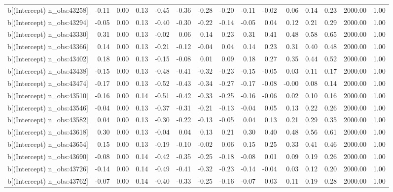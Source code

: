\begin{table}[ht]
\begin{tabular}{rrrrrrrrrrrrrrr}
  b[(Intercept) n\_obs:43258] & -0.11 & 0.00 & 0.13 & -0.45 & -0.36 & -0.28 & -0.20 & -0.11 & -0.02 & 0.06 & 0.14 & 0.23 & 2000.00 & 1.00 \\ 
  b[(Intercept) n\_obs:43294] & -0.05 & 0.00 & 0.13 & -0.40 & -0.30 & -0.22 & -0.14 & -0.05 & 0.04 & 0.12 & 0.21 & 0.29 & 2000.00 & 1.00 \\ 
  b[(Intercept) n\_obs:43330] & 0.31 & 0.00 & 0.13 & -0.02 & 0.06 & 0.14 & 0.23 & 0.31 & 0.41 & 0.48 & 0.58 & 0.65 & 2000.00 & 1.00 \\ 
  b[(Intercept) n\_obs:43366] & 0.14 & 0.00 & 0.13 & -0.21 & -0.12 & -0.04 & 0.04 & 0.14 & 0.23 & 0.31 & 0.40 & 0.48 & 2000.00 & 1.00 \\ 
  b[(Intercept) n\_obs:43402] & 0.18 & 0.00 & 0.13 & -0.15 & -0.08 & 0.01 & 0.09 & 0.18 & 0.27 & 0.35 & 0.44 & 0.52 & 2000.00 & 1.00 \\ 
  b[(Intercept) n\_obs:43438] & -0.15 & 0.00 & 0.13 & -0.48 & -0.41 & -0.32 & -0.23 & -0.15 & -0.05 & 0.03 & 0.11 & 0.17 & 2000.00 & 1.00 \\ 
  b[(Intercept) n\_obs:43474] & -0.17 & 0.00 & 0.13 & -0.52 & -0.43 & -0.34 & -0.27 & -0.17 & -0.08 & -0.00 & 0.08 & 0.14 & 2000.00 & 1.00 \\ 
  b[(Intercept) n\_obs:43510] & -0.16 & 0.00 & 0.14 & -0.51 & -0.42 & -0.33 & -0.25 & -0.16 & -0.06 & 0.02 & 0.10 & 0.16 & 2000.00 & 1.00 \\ 
  b[(Intercept) n\_obs:43546] & -0.04 & 0.00 & 0.13 & -0.37 & -0.31 & -0.21 & -0.13 & -0.04 & 0.05 & 0.13 & 0.22 & 0.26 & 2000.00 & 1.00 \\ 
  b[(Intercept) n\_obs:43582] & 0.04 & 0.00 & 0.13 & -0.30 & -0.22 & -0.13 & -0.05 & 0.04 & 0.13 & 0.21 & 0.29 & 0.35 & 2000.00 & 1.00 \\ 
  b[(Intercept) n\_obs:43618] & 0.30 & 0.00 & 0.13 & -0.04 & 0.04 & 0.13 & 0.21 & 0.30 & 0.40 & 0.48 & 0.56 & 0.61 & 2000.00 & 1.00 \\ 
  b[(Intercept) n\_obs:43654] & 0.15 & 0.00 & 0.13 & -0.19 & -0.10 & -0.02 & 0.06 & 0.15 & 0.25 & 0.33 & 0.41 & 0.46 & 2000.00 & 1.00 \\ 
  b[(Intercept) n\_obs:43690] & -0.08 & 0.00 & 0.14 & -0.42 & -0.35 & -0.25 & -0.18 & -0.08 & 0.01 & 0.09 & 0.19 & 0.26 & 2000.00 & 1.00 \\ 
  b[(Intercept) n\_obs:43726] & -0.14 & 0.00 & 0.14 & -0.49 & -0.41 & -0.32 & -0.23 & -0.14 & -0.04 & 0.03 & 0.12 & 0.20 & 2000.00 & 1.00 \\ 
  b[(Intercept) n\_obs:43762] & -0.07 & 0.00 & 0.14 & -0.40 & -0.33 & -0.25 & -0.16 & -0.07 & 0.03 & 0.11 & 0.19 & 0.28 & 2000.00 & 1.00 \\ 

\end{tabular}
\end{table}

